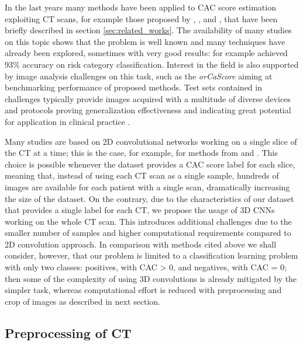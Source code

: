 In the last years many methods have been applied to CAC score estimation exploiting CT scans, for example those proposed by \citeauthor{Wolterink2015-ii} \cite{Wolterink2015-ii}, \citeauthor{Lessmann_2018} \cite{Lessmann_2018}, \citeauthor{Cano-Espinosa2018-gm} \cite{Cano-Espinosa2018-gm} and \citeauthor{de_Vos_2019} \cite{de_Vos_2019}, that have been briefly described in section \ref{sec:related_works}.
The availability of many studies on this topic shows that the problem is well known and many techniques have already been explored, sometimes with very good results: \citeauthor{de_Vos_2019} \cite{de_Vos_2019} for example achieved 93\% accuracy on risk category classification.
Interest in the field is also supported by image analysis challenges on this task, such as the \emph{orCaScore} \cite{wolterink2016evaluation} aiming at benchmarking performance of proposed methods.
Test sets contained in challenges typically provide images acquired with a multitude of diverse devices and protocols proving generalization effectiveness and indicating great potential for application in clinical practice \cite{vanvelzen2021ai}.

Many studies are based on 2D convolutional networks working on a single slice of the CT at a time; this is the case, for example, for methods from \citeauthor{Lessmann_2018} \cite{Lessmann_2018} and \citeauthor{de_Vos_2019} \cite{de_Vos_2019}.
This choice is possible whenever the dataset provides a CAC score label for each slice, meaning that, instead of using each CT scan as a single sample, hundreds of images are available for each patient with a single scan, dramatically increasing the size of the dataset.
On the contrary, due to the characteristics of our dataset that provides a single label for each CT, we propose the usage of 3D CNNs working on the whole CT scan.
This introduces additional challenges due to the smaller number of samples and higher computational requirements compared to 2D convolution approach.
In comparison with methods cited above we shall consider, however, that our problem is limited to a classification learning problem with only two classes: positives, with CAC > 0, and negatives, with CAC = 0; then some of the complexity of using 3D convolutions is already mitigated by the simpler task, whereas computational effort is reduced with preprocessing and crop of images as described in next section.


\subsection{Preprocessing of CT}

